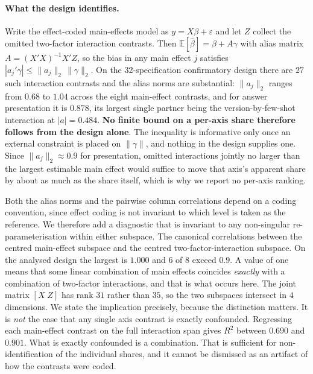 \documentclass[a4paper,fleqn]{cas-sc}
\begin{document}
\paragraph{What the design identifies.}\label{sec:methods-id} Write the effect-coded main-effects model as
$y=X\beta+\varepsilon$ and let $Z$ collect the omitted two-factor interaction contrasts. Then
$\mathbb{E}[\hat\beta]=\beta+A\gamma$ with alias matrix $A=(X'X)^{-1}X'Z$, so the bias in any main
effect $j$ satisfies $|a_j'\gamma|\le\lVert a_j\rVert_2\,\lVert\gamma\rVert_2$. On the
32-specification confirmatory design there are $27$ such interaction contrasts and the alias norms
are substantial: $\lVert a_j\rVert_2$ ranges from $0.68$ to $1.04$ across the eight main-effect
contrasts, and for answer presentation it is $0.878$, its largest single partner being the
version-by-few-shot interaction at $|a|=0.484$. \textbf{No finite bound on a per-axis share
therefore follows from the design alone}. The inequality is informative only once an external
constraint is placed on $\lVert\gamma\rVert$, and nothing in the design supplies one. Since
$\lVert a_j\rVert_2\approx0.9$ for presentation, omitted interactions jointly no larger than the
largest estimable main effect would suffice to move that axis's apparent share by about as much as
the share itself, which is why we report no per-axis ranking.

Both the alias norms and the pairwise column correlations depend on a coding convention, since effect coding is not invariant to which level is taken as the reference. We therefore add a diagnostic that is invariant to any non-singular
re-parameterisation within either subspace. The canonical correlations between the centred
main-effect subspace and the centred two-factor-interaction subspace. On the analysed design the
largest is $1.000$ and $6$ of $8$ exceed $0.9$. A value of one means that some linear combination
of main effects coincides \emph{exactly} with a combination of two-factor interactions, and that is what occurs here. The joint matrix $[X\;Z]$ has rank $31$ rather than $35$, so the two subspaces
intersect in $4$ dimensions. We state the implication precisely, because the distinction matters.
It is \emph{not} the case that any single axis contrast is exactly confounded. Regressing each
main-effect contrast on the full interaction span gives $R^2$ between $0.690$ and $0.901$. What is
exactly confounded is a combination. That is sufficient for non-identification of the individual
shares, and it cannot be dismissed as an artifact of how the contrasts were coded.
\end{document}
